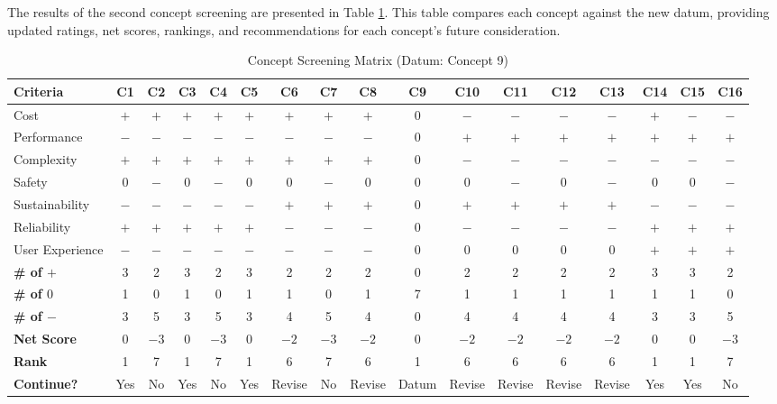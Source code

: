 \documentclass[12pt]{report}
\begin{document}
The results of the second concept screening are presented in Table \ref{tab:concept_screening_2}. This table compares each concept against the new datum, providing updated ratings, net scores, rankings, and recommendations for each concept's future consideration.

\begin{landscape}
\begin{table}[h!]
\centering
\caption{Concept Screening Matrix (Datum: Concept 9)}
\label{tab:concept_screening_2}
\begin{tabular}{l c c c c c c c c c c c c c c c c}
\toprule
\textbf{Criteria} & \textbf{C1} & \textbf{C2} & \textbf{C3} & \textbf{C4} & \textbf{C5} & \textbf{C6} & \textbf{C7} & \textbf{C8} & \textbf{C9} & \textbf{C10} & \textbf{C11} & \textbf{C12} & \textbf{C13} & \textbf{C14} & \textbf{C15} & \textbf{C16} \\
\midrule
Cost              & $+$ & $+$ & $+$ & $+$ & $+$ & $+$ & $+$ & $+$ & 0 & $-$ & $-$ & $-$ & $-$ & $+$ & $-$ & $-$ \\
Performance       & $-$ & $-$ & $-$ & $-$ & $-$ & $-$ & $-$ & $-$ & 0 & $+$ & $+$ & $+$ & $+$ & $+$ & $+$ & $+$ \\
Complexity        & $+$ & $+$ & $+$ & $+$ & $+$ & $+$ & $+$ & $+$ & 0 & $-$ & $-$ & $-$ & $-$ & $-$ & $-$ & $-$ \\
Safety            & 0 & $-$ & 0 & $-$ & 0 & 0 & $-$ & 0 & 0 & 0 & $-$ & 0 & $-$ & 0 & 0 & $-$ \\
Sustainability    & $-$ & $-$ & $-$ & $-$ & $-$ & $+$ & $+$ & $+$ & 0 & $+$ & $+$ & $+$ & $+$ & $-$ & $-$ & $-$ \\
Reliability       & $+$ & $+$ & $+$ & $+$ & $+$ & $-$ & $-$ & $-$ & 0 & $-$ & $-$ & $-$ & $-$ & $+$ & $+$ & $+$ \\
User Experience   & $-$ & $-$ & $-$ & $-$ & $-$ & $-$ & $-$ & $-$ & 0 & 0 & 0 & 0 & 0 & $+$ & $+$ & $+$ \\
\midrule
\textbf{\# of $+$} & 3 & 2 & 3 & 2 & 3 & 2 & 2 & 2 & 0 & 2 & 2 & 2 & 2 & 3 & 3 & 2 \\
\textbf{\# of $0$} & 1 & 0 & 1 & 0 & 1 & 1 & 0 & 1 & 7 & 1 & 1 & 1 & 1 & 1 & 1 & 0 \\
\textbf{\# of $-$} & 3 & 5 & 3 & 5 & 3 & 4 & 5 & 4 & 0 & 4 & 4 & 4 & 4 & 3 & 3 & 5 \\
\textbf{Net Score} & 0 & $-3$ & 0 & $-3$ & 0 & $-2$ & $-3$ & $-2$ & 0 & $-2$ & $-2$ & $-2$ & $-2$ & 0 & 0 & $-3$ \\
\textbf{Rank}      & 1 & 7 & 1 & 7 & 1 & 6 & 7 & 6 & 1 & 6 & 6 & 6 & 6 & 1 & 1 & 7 \\
\textbf{Continue?} & Yes & No & Yes & No & Yes & Revise & No & Revise & Datum & Revise & Revise & Revise & Revise & Yes & Yes & No \\
\bottomrule
\end{tabular}
\end{table}
\end{landscape}
\end{document}
